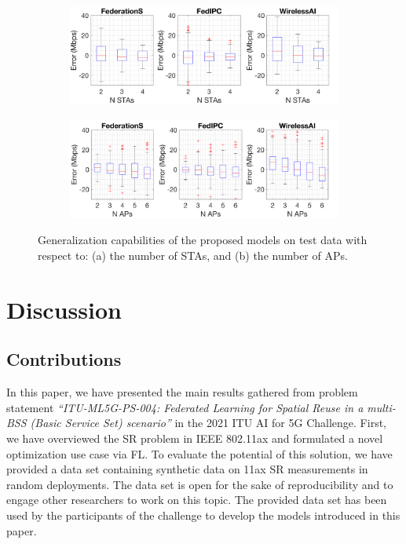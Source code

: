 \documentclass[10pt,a4paper,twocolumn]{article}
\newcommand{\ITUpar}{\vspace{8pt}\par}
\def\startfigure{\vspace{6pt}\begin{figure}[ht]\center}
\begin{document}
\startfigure
\begin{subfigure}[b]{\linewidth}
	\centering
	\includegraphics[width=\textwidth]{img/boxplot_num_stas}
	\caption{}
	\label{fig:boxplot_num_stas}
\end{subfigure}
\begin{subfigure}[b]{\linewidth}
	\centering
	\includegraphics[width=\textwidth]{img/boxplot_num_aps}
	\caption{}
	\label{fig:boxplot_num_aps}
\end{subfigure}
\caption{Generalization capabilities of the proposed models on test data with respect to: (a) the number of STAs, and (b) the number of APs.}\label{fig:boxplot_complexity} 
\end{figure}

\section{Discussion}
\label{section:conclusions}

\subsection{Contributions}

In this paper, we have presented the main results gathered from problem statement \textit{``ITU-ML5G-PS-004: Federated Learning for Spatial Reuse in a multi-BSS (Basic Service Set) scenario''} in the 2021 ITU AI for 5G Challenge. First, we have overviewed the SR problem in IEEE 802.11ax and formulated a novel optimization use case via FL. To evaluate the potential of this solution, we have provided a data set containing synthetic data on 11ax SR measurements in random deployments. The data set is open for the sake of reproducibility and to engage other researchers to work on this topic. The provided data set has been used by the participants of the challenge to develop the models introduced in this paper.\ITUpar 
\end{document}
